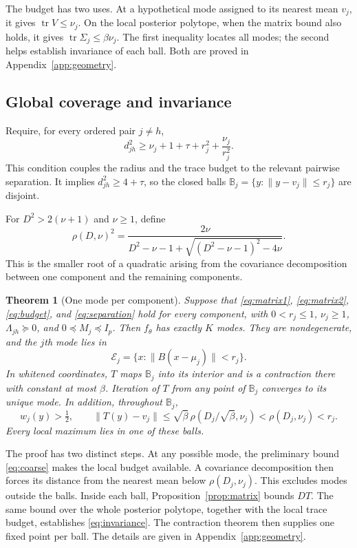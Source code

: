\documentclass[12pt,a4paper]{article}
\newtheorem{theorem}{Theorem}[section]
\theoremstyle{remark}
\DeclareMathOperator{\tr}{tr}
\begin{document}
The budget has two uses. At a hypothetical mode assigned to its nearest mean $v_j$, it gives $\tr V\le\nu_j$. On the local posterior polytope, when the matrix bound also holds, it gives $\tr\Sigma_j\le\beta\nu_j$. The first inequality locates all modes; the second helps establish invariance of each ball. Both are proved in Appendix~\ref{app:geometry}.

\subsection{Global coverage and invariance}

Require, for every ordered pair $j\ne h$,
\begin{equation}\label{eq:separation}
 d_{jh}^2\ge \nu_j+1+\tau+r_j^2+\frac{\nu_j}{r_j^2}.
\end{equation}
This condition couples the radius and the trace budget to the relevant pairwise separation. It implies $d_{jh}^2\ge4+\tau$, so the closed balls
$\mathbb B_j=\{y:\|y-v_j\|\le r_j\}$ are disjoint.

For $D^2>2(\nu+1)$ and $\nu\ge1$, define
\begin{equation}\label{eq:rho}
 \rho(D,\nu)^2=
 \frac{2\nu}{D^2-\nu-1+
          \sqrt{(D^2-\nu-1)^2-4\nu}}.
\end{equation}
This is the smaller root of a quadratic arising from the covariance decomposition between one component and the remaining components.

\begin{theorem}[One mode per component]\label{thm:modes}
Suppose that \eqref{eq:matrix1}, \eqref{eq:matrix2}, \eqref{eq:budget}, and \eqref{eq:separation} hold for every component, with $0<r_j\le1$, $\nu_j\ge1$, $\Lambda_{jh}\succeq0$, and $0\preceq M_j\preceq I_p$. Then $f_\theta$ has exactly $K$ modes. They are nondegenerate, and the $j$th mode lies in
\[
 \mathcal E_j=\{x:\|B(x-\mu_j)\|<r_j\}.
\]
In whitened coordinates, $T$ maps $\mathbb B_j$ into its interior and is a contraction there with constant at most $\beta$. Iteration of $T$ from any point of $\mathbb B_j$ converges to its unique mode. In addition, throughout $\mathbb B_j$,
\begin{equation}\label{eq:invariance}
 w_j(y)>\tfrac12,\qquad
 \|T(y)-v_j\|
 \le\sqrt\beta\,\rho(D_j/\sqrt\beta,\nu_j)
 <\rho(D_j,\nu_j)<r_j.
\end{equation}
Every local maximum lies in one of these balls.
\end{theorem}

The proof has two distinct steps. At any possible mode, the preliminary bound \eqref{eq:coarse} makes the local budget available. A covariance decomposition then forces its distance from the nearest mean below $\rho(D_j,\nu_j)$. This excludes modes outside the balls. Inside each ball, Proposition~\ref{prop:matrix} bounds $DT$. The same bound over the whole posterior polytope, together with the local trace budget, establishes \eqref{eq:invariance}. The contraction theorem then supplies one fixed point per ball. The details are given in Appendix~\ref{app:geometry}.
\end{document}

